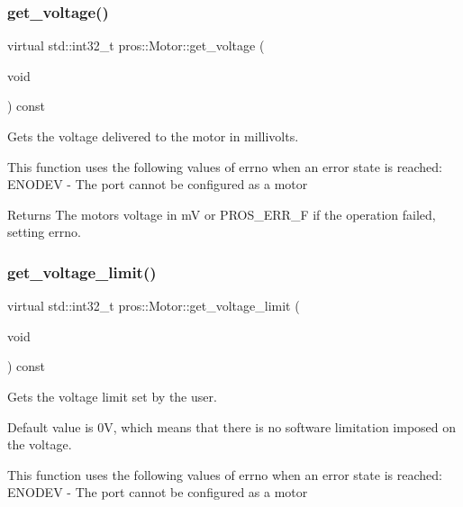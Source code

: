 \subsubsection{\texorpdfstring{get\+\_\+voltage()}{get\_voltage()}}
{\footnotesize\ttfamily virtual std\+::int32\+\_\+t pros\+::\+Motor\+::get\+\_\+voltage (\begin{DoxyParamCaption}\item[{void}]{ }\end{DoxyParamCaption}) const\hspace{0.3cm}{\ttfamily [virtual]}}



Gets the voltage delivered to the motor in millivolts. 

This function uses the following values of errno when an error state is reached\+: E\+N\+O\+D\+EV -\/ The port cannot be configured as a motor

\begin{DoxyReturn}{Returns}
The motor\textquotesingle{}s voltage in mV or P\+R\+O\+S\+\_\+\+E\+R\+R\+\_\+F if the operation failed, setting errno. 
\end{DoxyReturn}
\mbox{\label{classpros_1_1Motor_a2afbe15bed764ca6d21f1e7c6c8da700}} 
\subsubsection{\texorpdfstring{get\+\_\+voltage\+\_\+limit()}{get\_voltage\_limit()}}
{\footnotesize\ttfamily virtual std\+::int32\+\_\+t pros\+::\+Motor\+::get\+\_\+voltage\+\_\+limit (\begin{DoxyParamCaption}\item[{void}]{ }\end{DoxyParamCaption}) const\hspace{0.3cm}{\ttfamily [virtual]}}



Gets the voltage limit set by the user. 

Default value is 0V, which means that there is no software limitation imposed on the voltage.

This function uses the following values of errno when an error state is reached\+: E\+N\+O\+D\+EV -\/ The port cannot be configured as a motor

